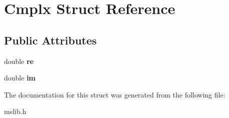 \hypertarget{structCmplx}{\section{Cmplx Struct Reference}
\label{structCmplx}
}
\subsection*{Public Attributes}
\begin{DoxyCompactItemize}
\item 
\hypertarget{structCmplx_af4f6cad7039b682154f6c7fb92f3bb40}{double {\bfseries re}}\label{structCmplx_af4f6cad7039b682154f6c7fb92f3bb40}

\item 
\hypertarget{structCmplx_a43a0db2740866df30cc168d6a0a0d7b1}{double {\bfseries im}}\label{structCmplx_a43a0db2740866df30cc168d6a0a0d7b1}

\end{DoxyCompactItemize}


The documentation for this struct was generated from the following file\-:\begin{DoxyCompactItemize}
\item 
mslib.\-h\end{DoxyCompactItemize}
